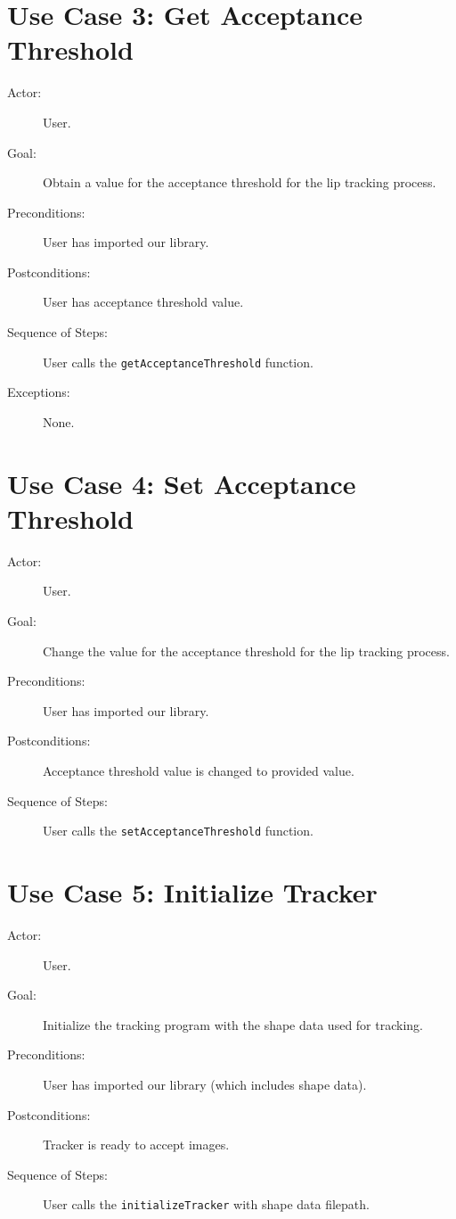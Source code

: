 \section{Use Case 3: Get Acceptance Threshold}

\begin{description}
  \item[Actor:] User.
  \item[Goal:] Obtain a value for the acceptance threshold for the lip tracking process.
  \item[Preconditions:] User has imported our library.
  \item[Postconditions:] User has acceptance threshold value.
  \item[Sequence of Steps:] User calls the \texttt{getAcceptanceThreshold} function.
  \item[Exceptions:] None.
\end{description}


\section{Use Case 4: Set Acceptance Threshold}

\begin{description}
  \item[Actor:] User.
  \item[Goal:] Change the value for the acceptance threshold for the lip tracking process.
  \item[Preconditions:] User has imported our library.
  \item[Postconditions:] Acceptance threshold value is changed to provided value.
  \item[Sequence of Steps:] User calls the \texttt{setAcceptanceThreshold} function.
\end{description}

\section{Use Case 5: Initialize Tracker}

\begin{description}
	\item[Actor:] User.
	\item[Goal:] Initialize the tracking program with the shape data used for tracking.
	\item[Preconditions:] User has imported our library (which includes shape data).
	\item[Postconditions:] Tracker is ready to accept images.
	\item[Sequence of Steps:] User calls the \texttt{initializeTracker} with shape data filepath.
\end{description}

